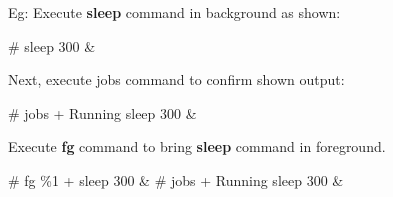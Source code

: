 \begin{flushleft}
\begin{enumerate}
\begin{itemize}
\begin{enumerate}
			Eg: Execute \textbf{sleep} command in background as shown:
			\begin{tcolorbox}[breakable,notitle,boxrule=-0pt,colback=black,colframe=black]
				\color{green}
				\font=9pt
				\# sleep 300 \&
				\font=4pt
			\end{tcolorbox}
			Next, execute jobs command to confirm shown output:
			\begin{tcolorbox}[breakable,notitle,boxrule=-0pt,colback=black,colframe=black]
				\color{green}
				\font=9pt
				\# jobs 
				\color{white}
				\newline
				[1]+  Running                 sleep 300 \&
				\font=4pt
			\end{tcolorbox}
			Execute \textbf{fg} command to bring \textbf{sleep} command in foreground.
			\begin{tcolorbox}[breakable,notitle,boxrule=-0pt,colback=black,colframe=black]
				\color{green}
				\font=9pt
				\# fg \%1
				\color{white}
				\newline
				[1]+ sleep 300 \&
				\newline
				\color{green}
				\# jobs
				\color{white}
				\newline
				[1]+  Running                 sleep 300 \&
				\font=4pt
			\end{tcolorbox}
			
		\end{enumerate}
		


\end{itemize}
\end{enumerate}
\end{flushleft}
